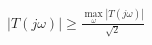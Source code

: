 \begin {align}[] \left|T(j\omega)\right| \ge \frac {\max _\omega |T(j\omega )|}{\sqrt {2}} \end {align} 

